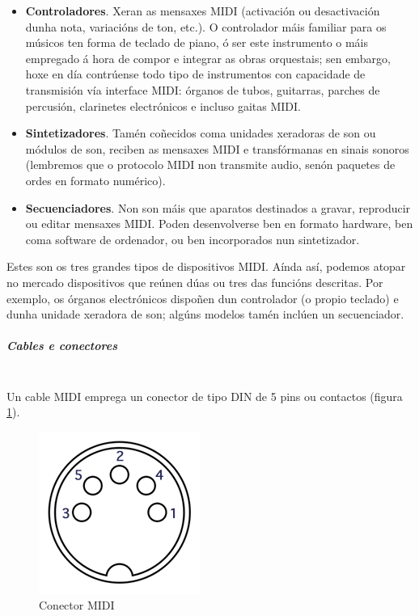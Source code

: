    \begin{itemize}
     \item \textbf{Controladores}. Xeran as mensaxes MIDI (activación ou
           desactivación dunha nota, variacións de ton, etc.). O controlador
           máis familiar para os músicos ten forma de teclado de piano, ó ser
           este instrumento o máis empregado á hora de compor e integrar as
           obras orquestais; sen embargo, hoxe en día contrúense todo tipo de
           instrumentos con capacidade de transmisión vía interface MIDI:
           órganos de tubos, guitarras, parches de percusión, clarinetes
           electrónicos e incluso gaitas MIDI.
     \item \textbf{Sintetizadores}. Tamén coñecidos coma unidades xeradoras de
           son ou módulos de son, reciben as mensaxes MIDI e transfórmanas en
           sinais sonoros (lembremos que o protocolo MIDI non transmite audio,
           senón paquetes de ordes en formato numérico).
     \item \textbf{Secuenciadores}. Non son máis que aparatos destinados a
           gravar, reproducir ou editar mensaxes MIDI. Poden desenvolverse ben
           en formato hardware, ben coma software de ordenador, ou ben
           incorporados nun sintetizador.
    \end{itemize}

    Estes son os tres grandes tipos de dispositivos MIDI. Aínda así, podemos
    atopar no mercado dispositivos que reúnen dúas ou tres das funcións
    descritas. Por exemplo, os órganos electrónicos dispoñen dun controlador (o
    propio teclado) e dunha unidade xeradora de son; algúns modelos tamén
    inclúen un secuenciador.

    \subparagraph{Cables e conectores}\mbox{}\\

    Un cable MIDI emprega un conector de tipo DIN de 5 pins ou contactos
    (figura \ref{figura:WikipediaConectorMIDI}).

    \begin{figure}[htbp]
     \centering
     \includegraphics[scale=0.5,keepaspectratio=true]{./imagenes/wikipedia-conector-midi.png}
     \caption[Conector MIDI]{Conector MIDI \cite{WikipediaMIDI}}
     \label{figura:WikipediaConectorMIDI}
    \end{figure}

